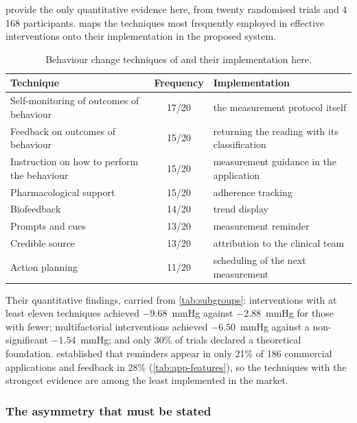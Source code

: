 \documentclass[12pt,a4paper,oneside]{report}
\begin{document}
\Textcite{zhou2024} provide the only quantitative evidence here, from twenty randomised trials and 4\,168 participants.  maps the techniques most frequently employed in effective interventions onto their implementation in the proposed system.

\begin{table}[htbp]
\centering\small
\caption{Behaviour change techniques of \textcite{zhou2024} and their implementation here.}\label{tab:bct-implementation}
\begin{tabularx}{\textwidth}{@{}>{\raggedright\arraybackslash}p{5.4cm} c X@{}}
\toprule
\textbf{Technique} & \textbf{Frequency} & \textbf{Implementation} \\
\midrule
Self-monitoring of outcomes of behaviour & 17/20 & the measurement protocol itself \\
Feedback on outcomes of behaviour & 15/20 & returning the reading with its classification \\
Instruction on how to perform the behaviour & 15/20 & measurement guidance in the application \\
Pharmacological support & 15/20 & adherence tracking \\
Biofeedback & 14/20 & trend display \\
Prompts and cues & 13/20 & measurement reminder \\
Credible source & 13/20 & attribution to the clinical team \\
Action planning & 11/20 & scheduling of the next measurement \\
\bottomrule
\end{tabularx}
\end{table}

Their quantitative findings, carried from \cref{tab:subgroups}: interventions with at least eleven techniques achieved $-9.68$~mmHg against $-2.88$~mmHg for those with fewer; multifactorial interventions achieved $-6.50$~mmHg against a non-significant $-1.54$~mmHg; and only 30\% of trials declared a theoretical foundation. \Textcite{alessa2019} established that reminders appear in only 21\% of 186 commercial applications and feedback in 28\% (\cref{tab:app-features}), so the techniques with the strongest evidence are among the least implemented in the market.

\subsubsection{The asymmetry that must be stated}
\end{document}
